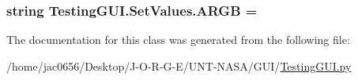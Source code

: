 \subsubsection[{\texorpdfstring{A\+R\+GB}{ARGB}}]{\setlength{\rightskip}{0pt plus 5cm}string Testing\+G\+U\+I.\+Set\+Values.\+A\+R\+GB = \textquotesingle{}\textquotesingle{}\hspace{0.3cm}{\ttfamily [static]}}\hypertarget{classTestingGUI_1_1SetValues_a203442ab808fd942b5e86a3b8ec2fc15}{}\label{classTestingGUI_1_1SetValues_a203442ab808fd942b5e86a3b8ec2fc15}


The documentation for this class was generated from the following file\+:\begin{DoxyCompactItemize}
\item 
/home/jac0656/\+Desktop/\+J-\/\+O-\/\+R-\/\+G-\/\+E/\+U\+N\+T-\/\+N\+A\+S\+A/\+G\+U\+I/\hyperlink{GUI_2TestingGUI_8py}{Testing\+G\+U\+I.\+py}\end{DoxyCompactItemize}
